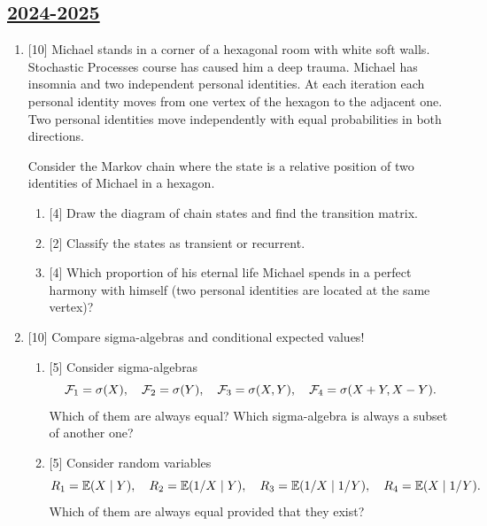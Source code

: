 \subsection[2024-2025]{\hyperref[sec:sol_kr_01_2024_2025]{2024-2025}}
\label{sec:kr_01_2024_2025} %


\begin{enumerate}
    \item {[10]} Michael stands in a corner of a hexagonal room with white soft walls. 
    Stochastic Processes course has caused him a deep trauma.
    Michael has insomnia and two independent personal identities.     
    At each iteration each personal identity moves from one vertex of the hexagon to the adjacent one.
    Two personal identities move independently with equal probabilities in both directions. 
    
    Consider the Markov chain where the state is a relative position of two identities of Michael in a hexagon. 
    \begin{enumerate}
        \item {[4]} Draw the diagram of chain states and find the transition matrix. 
        \item {[2]} Classify the states as transient or recurrent. 
        \item {[4]} Which proportion of his eternal life Michael spends in a perfect harmony with himself (two personal identities are located at the same vertex)?
    \end{enumerate}


    \item {[10]} Compare sigma-algebras and conditional expected values!
    
    \begin{enumerate}
        \item {[5]} Consider sigma-algebras 
        \[
        \cF_1 = \sigma(X), \quad \cF_2 = \sigma(Y), \quad \cF_3 = \sigma(X, Y), \quad \cF_4 = \sigma(X + Y, X - Y). %
        \]
        Which of them are always equal? Which sigma-algebra is always a subset of another one?

        \item {[5]} Consider random variables 
        \[
        R_1 = \E(X \mid Y), \quad R_2 = \E(1 / X \mid Y), \quad R_3 = \E(1 / X \mid 1/Y), \quad R_4 = \E(X \mid 1/Y). %
        \]
        Which of them are always equal provided that they exist?
    \end{enumerate}
    

\end{enumerate}
